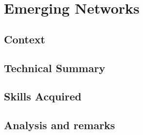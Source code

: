 \section{Emerging Networks}
\subsection{Context}
\subsection{Technical Summary}
\subsection{Skills Acquired}
\subsection{Analysis and remarks}